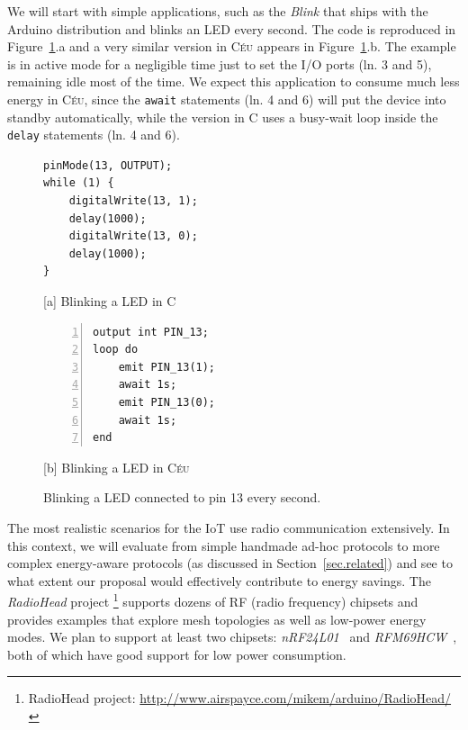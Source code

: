 \documentclass[12pt,english]{amsart}
\newcommand{\CEU}{\textsc{C\'{e}u}\xspace}
\newcommand{\code}[1] {{\small{\texttt{#1}}}}
\begin{document}
We will start with simple applications, such as the \emph{Blink} that ships
with the Arduino distribution and blinks an LED every second.
The code is reproduced in Figure~\ref{lst.blink}.a and a very similar version
in \CEU appears in Figure~\ref{lst.blink}.b.
%
The example is in active mode for a negligible time just to set the I/O ports
(ln. 3 and 5), remaining idle most of the time.
%
We expect this application to consume much less energy in \CEU, since the
\code{await} statements (ln. 4 and 6) will put the device into standby
automatically, while the version in C uses a busy-wait loop inside the
\code{delay} statements (ln. 4 and 6).

{\linespread{1}
\begin{figure}[t]
\begin{minipage}[t]{0.49\linewidth}
\begin{lstlisting}[xrightmargin=1cm]
pinMode(13, OUTPUT);
while (1) {
    digitalWrite(13, 1);
    delay(1000);
    digitalWrite(13, 0);
    delay(1000);
}
\end{lstlisting}
\centering\small{[a] Blinking a LED in C}
\end{minipage}
%
\begin{minipage}[t]{0.49\linewidth}
\begin{lstlisting}[numbers=left]
output int PIN_13;
loop do
    emit PIN_13(1);
    await 1s;
    emit PIN_13(0);
    await 1s;
end
\end{lstlisting}
\centering\small{[b] Blinking a LED in \CEU}
\end{minipage}
\caption{ Blinking a LED connected to pin 13 every second.
\label{lst.blink}
}
\end{figure}
}

The most realistic scenarios for the IoT use radio communication extensively.
%
In this context, we will evaluate from simple handmade ad-hoc protocols to more
complex energy-aware protocols (as discussed in Section~\ref{sec.related}) and
see to what extent our proposal would effectively contribute to energy savings.
%
The \emph{RadioHead} project%
\footnote{RadioHead project: \url{http://www.airspayce.com/mikem/arduino/RadioHead/}}
supports dozens of RF (radio frequency) chipsets and provides examples that
explore mesh topologies as well as low-power energy modes.
%
We plan to support at least two chipsets: \emph{nRF24L01}~\cite{radio.nrf24l01}
and \emph{RFM69HCW}~\cite{radio.rfm69hcw}, both of which have good support for
low power consumption.
%
%
\end{document}
